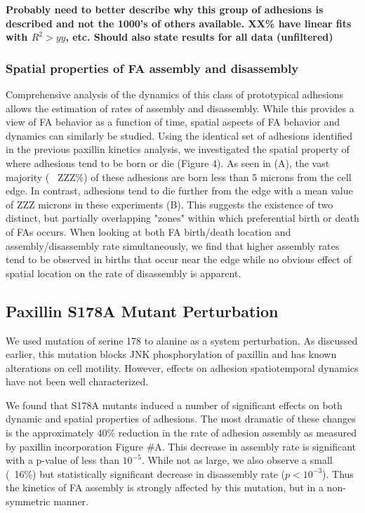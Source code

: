 \documentclass[10pt]{article}
\begin{document}
\textbf{Probably need to better describe why this group of adhesions is described and not the
1000's of others available. XX\% have linear fits with $R^2 > yy$, etc. Should
also state results for all data (unfiltered)} 

\subsubsection*{Spatial properties of FA assembly and disassembly}

Comprehensive analysis of the dynamics of this class of prototypical adhesions allows
the estimation of rates of assembly and disassembly. While this provides a view
of FA behavior as a function of time, spatial aspects of FA behavior and
dynamics can similarly be studied. Using the identical set of adhesions
identified in the previous paxillin kinetics analysis, we investigated the
spatial property of where adhesions tend to be born or die (Figure 4). As seen
in (A), the vast majority (~ ZZZ\%) of these adhesions are born less than 5
microns from the cell edge. In contrast, adhesions tend to die further from the
edge with a mean value of ZZZ microns in these experiments (B). This suggests
the existence of two distinct, but partially overlapping "zones" within which
preferential birth or death of FAs occurs. When looking at both FA birth/death
location and assembly/disassembly rate simultaneously, we find that higher
assembly rates tend to be observed in births that occur near the edge while no
obvious effect of spatial location on the rate of disassembly is apparent. 


\subsection*{Paxillin S178A Mutant Perturbation}

We used mutation of serine 178 to alanine as a system perturbation. As discussed earlier, this
mutation blocks JNK phosphorylation of paxillin and has known alterations on
cell motility. However, effects on adhesion spatiotemporal dynamics have not
been well characterized.

We found that S178A mutants induced a number of significant effects on both
dynamic and spatial properties of adhesions. The most dramatic of these changes
is the approximately 40\% reduction in the rate of adhesion assembly as measured
by paxillin incorporation Figure \#A. This decrease in assembly rate is
significant with a p-value of less than $10^{-5}$. While not as large, we also
observe a small (~16\%) but statistically significant decrease in disassembly
rate ($p<10^{-3}$). Thus the kinetics of FA assembly is strongly affected by this mutation, but in a non-symmetric manner.
\end{document}
